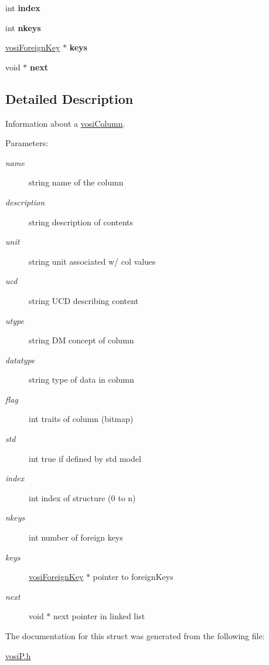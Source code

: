 \begin{CompactItemize}
\item 
\hypertarget{structvosiColumn_9f659facaa2130e3becaa260a56c0f3f}{
int \textbf{index}}
\label{structvosiColumn_9f659facaa2130e3becaa260a56c0f3f}

\item 
\hypertarget{structvosiColumn_c8b5c7bcae629c7a46aa7b8df258bc41}{
int \textbf{nkeys}}
\label{structvosiColumn_c8b5c7bcae629c7a46aa7b8df258bc41}

\item 
\hypertarget{structvosiColumn_4396627b255f313d39f204b076262071}{
\hyperlink{structvosiForeignKey}{vosiForeignKey} $\ast$ \textbf{keys}}
\label{structvosiColumn_4396627b255f313d39f204b076262071}

\item 
\hypertarget{structvosiColumn_bc4dbb90272c755546ddad1f5e91d34d}{
void $\ast$ \textbf{next}}
\label{structvosiColumn_bc4dbb90272c755546ddad1f5e91d34d}

\end{CompactItemize}


\subsection{Detailed Description}
Information about a \hyperlink{structvosiColumn}{vosiColumn}. 

\begin{Desc}
\item[Parameters:]
\begin{description}
\item[{\em name}]string name of the column \item[{\em description}]string description of contents \item[{\em unit}]string unit associated w/ col values \item[{\em ucd}]string UCD describing content \item[{\em utype}]string DM concept of column \item[{\em datatype}]string type of data in column \item[{\em flag}]int traits of column (bitmap) \item[{\em std}]int true if defined by std model \item[{\em index}]int index of structure (0 to n) \item[{\em nkeys}]int number of foreign keys \item[{\em keys}]\hyperlink{structvosiForeignKey}{vosiForeignKey} $\ast$ pointer to foreignKeys \item[{\em next}]void $\ast$ next pointer in linked list \end{description}
\end{Desc}


The documentation for this struct was generated from the following file:\begin{CompactItemize}
\item 
\hyperlink{vosiP_8h}{vosiP.h}\end{CompactItemize}
